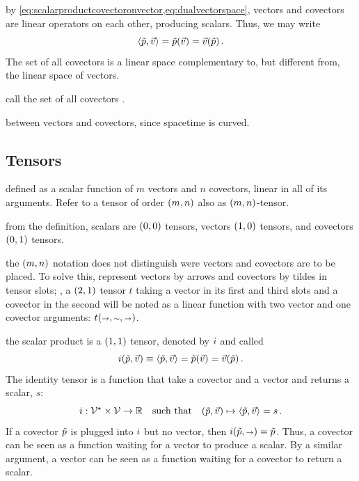  by \cref{eq:scalarproductcovectoronvector,eq:dualvectorspace}, vectors and covectors are linear operators on each other, producing scalars. Thus, we may write
%
\begin{equation*}
  \sprod{\cov p}{\vec v} = \cov p\vat{\vec v}
                         = \vec v\vat{\cov p}\,.
\end{equation*}
%
The set of all covectors is a linear space complementary to, but different from, the linear space of vectors.

 call the set of all covectors .

 between vectors and covectors, since spacetime is curved.


\subsection{Tensors}
%
 defined as a scalar function of $m$ vectors and $n$ covectors, linear in all of its arguments. Refer to a tensor of order $\torder mn$ also as $\torder mn$-tensor.

 from the definition, scalars are $\torder 00$ tensors, vectors $\torder 10$ tensors, and covectors $\torder 01$ tensors.

 the $\torder mn$ notation does not distinguish were vectors and covectors are to be placed. To solve this, represent vectors by arrows and covectors by tildes in tensor slots; \eg, a $\torder 21$ tensor $t$ taking a vector in its first and third slots and a covector in the second will be noted as a linear function with two vector and one covector arguments: $t\vat{\vslot,\cslot,\vslot}$.

 the scalar product is a $\torder 11$ tensor, denoted by $i$ and called 
%
\begin{equation}\label{eq:identitytensordefinition}
  \idtens\vat{\cov p, \vec v} \defas \sprod{\cov p}{\vec v}
                              = \cov p\vat{\vec v}
                              = \vec v\vat{\cov p}\,.
\end{equation}
%
The identity tensor is a function that take a covector and a vector and returns a scalar, $s$:
%
\begin{equation*}
  \fdef{\idtens}{\dlspace V\setprod\lspace V}{\rspace}\suchthat
  \fmap{\tuple{\cov p,\vec v}}{\sprod{\cov p}{\vec v} = s}\,.
\end{equation*}
%
If a covector $\tilde{p}$ is plugged into $i$ but no vector, then $\idtens\vat{\cov p, \vslot} = \cov p$. Thus, a covector can be seen as a function waiting for a vector to produce a scalar. By a similar argument, a vector can be seen as a function waiting for a covector to return a scalar.

